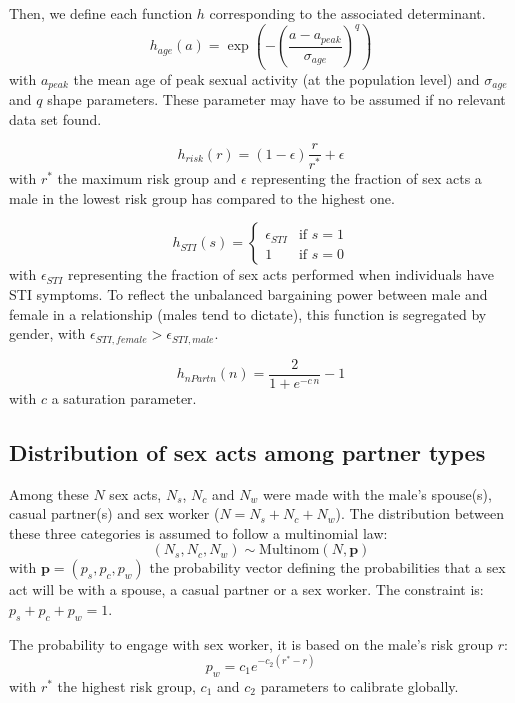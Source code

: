 \documentclass[11pt, onecolumn]{article}
\begin{document}
Then, we define each function $h$ corresponding to the associated determinant.
$$h_{age}(a) = \exp \left(-\left(\frac{a-a_{peak}}{\sigma_{age}}\right)^q \right)$$
with $a_{peak}$ the mean age of peak sexual activity (at the population level) and $\sigma_{age}$ and $q$ shape parameters. These parameter may have to be assumed if no relevant data set found.

$$h_{risk}(r) = (1-\epsilon)\frac{r}{r^*} + \epsilon $$
with $r^*$ the maximum risk group and $\epsilon$ representing the fraction of sex acts a male in the lowest risk group has compared to the highest one.

$$h_{STI}(s) = 
\begin{cases}
\epsilon_{STI} & \text{if } s=1\\
1 & \text{if } s=0
\end{cases}$$
with $\epsilon_{STI}$ representing the fraction of sex acts performed when individuals have STI symptoms. To reflect the unbalanced bargaining power between male and female in a relationship (males tend to dictate), this function is segregated by gender, with $\epsilon_{STI,female}>\epsilon_{STI,male}$. 

$$h_{nPartn}(n) = \frac{2}{1+e^{-c\, n}} -1 $$
with $c$ a saturation parameter.

\subsection{Distribution of sex acts among partner types}

Among these $N$ sex acts, $N_s$, $N_c$ and $N_w$ were made with the male's spouse(s), casual partner(s) and sex worker ($N=N_s+N_c+N_w$). The distribution between these three categories is assumed to follow a multinomial law: 
$$(N_s,N_c,N_w) \sim \mathrm{Multinom}(N,\mathbf{p}) $$
with $\mathbf{p}=(p_s,p_c,p_w)$ the probability vector defining the probabilities that a sex act will be with a spouse, a casual partner or a sex worker. The constraint is: $p_s+p_c+p_w=1$.

The probability to engage with sex worker, it is based on the male's risk group $r$:
$$ p_w = c_1 e^{-c_2(r^*-r)}$$
with $r^*$ the highest risk group, $c_1$ and $c_2$ parameters to calibrate globally.
\end{document}
